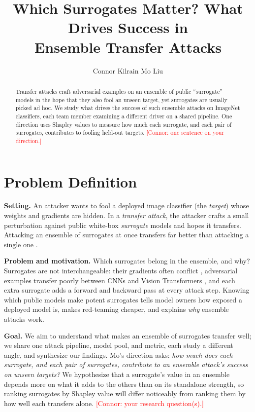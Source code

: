 \documentclass{article}
\title{Which Surrogates Matter? What Drives Success in\\Ensemble Transfer Attacks}
\author{%
  Connor Kilrain \And Mo Liu
}
\newcommand{\connor}[1]{\textcolor{red}{[Connor: #1]}}
\begin{document}
\maketitle

\begin{abstract}
  Transfer attacks craft adversarial examples on an ensemble of public ``surrogate'' models in the hope that they also fool an unseen target, yet surrogates are usually picked ad hoc. We study what drives the success of such ensemble attacks on ImageNet classifiers, each team member examining a different driver on a shared pipeline. One direction uses Shapley values to measure how much each surrogate, and each pair of surrogates, contributes to fooling held-out targets. \connor{one sentence on your direction.}
\end{abstract}

\section{Problem Definition}

\textbf{Setting.} An attacker wants to fool a deployed image classifier (the \emph{target}) whose weights and gradients are hidden. In a \emph{transfer attack}, the attacker crafts a small perturbation against public white-box \emph{surrogate} models and hopes it transfers. Attacking an ensemble of surrogates at once transfers far better than attacking a single one \citep{liu2017delving, dong2018boosting}.

\textbf{Problem and motivation.} Which surrogates belong in the ensemble, and why? Surrogates are not interchangeable: their gradients often conflict \citep{liu2017delving, xiong2022svre}, adversarial examples transfer poorly between CNNs and Vision Transformers \citep{mahmood2021robustness}, and each extra surrogate adds a forward and backward pass at every attack step. Knowing which public models make potent surrogates tells model owners how exposed a deployed model is, makes red-teaming cheaper, and explains \emph{why} ensemble attacks work.

\textbf{Goal.} We aim to understand what makes an ensemble of surrogates transfer well; we share one attack pipeline, model pool, and metric, each study a different angle, and synthesize our findings. Mo's direction asks: \emph{how much does each surrogate, and each pair of surrogates, contribute to an ensemble attack's success on unseen targets?} We hypothesize that a surrogate's value in an ensemble depends more on what it adds to the others than on its standalone strength, so ranking surrogates by Shapley value will differ noticeably from ranking them by how well each transfers alone. \connor{your research question(s).}
\end{document}
